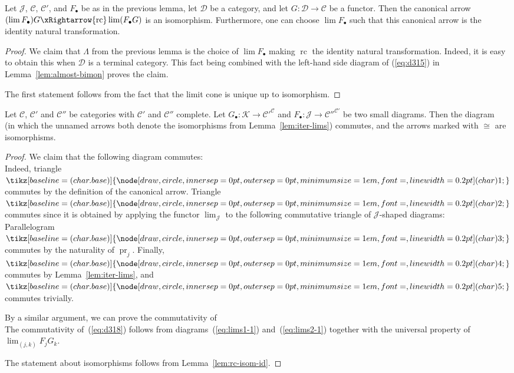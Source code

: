 \documentclass[10pt]{simplearticle}
\newcommand{\tikzinput}[1]{}
\newcommand{\tcbase}[1]{%
  \mathord{%
    \tikz[baseline=(char.base)]{
      \node[draw,circle,inner sep=0pt,outer sep=0pt,minimum size=1em,font=\small,line width=0.2pt] (char) {#1};
    }%
  }%
}
\newcommand{\pr}{\operatorname{pr}}
\newcommand{\tc}[1]{\tcbase{#1}}
\newcommand{\rc}{\operatorname{rc}}
\begin{document}
\begin{lem}\label{lem:rc-isom-id}
Let
$\mathcal{J}$, $\mathcal{C}$,
$\mathcal{C}'$, and $F_{\bullet}$ be as in the previous lemma, let
$\mathcal{D}$ be a category, and let $G\colon\mathcal{D}\to\mathcal{C}$
be a functor. Then the canonical arrow $(\lim F_{\bullet})G\xRightarrow{\rc}\lim(F_{\bullet}G)$
is an isomorphism. Furthermore, one can choose $\lim F_{\bullet}$
such that this canonical arrow is the identity natural transformation.
\end{lem}

\begin{proof}
We claim that $\Lambda$ from the previous lemma is the choice of
$\lim F_{\bullet}$ making $\rc$ the identity natural transformation.
Indeed, it is easy to obtain this when $\mathcal{D}$ is a terminal
category. This fact being combined with the left-hand side diagram
of (\ref{eq:d315}) in Lemma~\ref{lem:almost-bimon} proves the claim.

The first statement follows from the fact that the limit cone is unique
up to isomorphism.
\end{proof}

\begin{lem}\label{lem:lim-prod}
Let $\mathcal{C}$, $\mathcal{C}'$ and $\mathcal{C}''$
be categories with $\mathcal{C}'$ and $\mathcal{C}''$ complete.
Let $G_{\bullet}\colon\mathcal{K}\to\mathcal{C}'^{\mathcal{C}}$ and
$F_{\bullet}\colon\mathcal{J}\to\mathcal{C}''^{\mathcal{C}'}$ be
two small diagrams. Then the diagram
\begin{equation}
\tikzinput{d318}\label{eq:d318}
\end{equation}
(in which the unnamed arrows both denote the isomorphisms from Lemma~\ref{lem:iter-lims})
commutes, and the arrows marked with $\cong$ are isomorphisms.
\end{lem}

\begin{proof}
We claim that the following diagram commutes:
\begin{equation}
\tikzinput{d488}\label{eq:lims1-1}
\end{equation}
Indeed, triangle~$\tc 1$ commutes by the definition of the canonical
arrow. Triangle~$\tc 2$ commutes since it is obtained by applying
the functor
$\lim_{\mathcal{J}}$ to the following
commutative triangle of $\mathcal{J}$-shaped diagrams:
\begin{equation}
\tikzinput{d340}\label{eq:nat-canonar-1}
\end{equation}
Parallelogram~$\tc 3$ commutes by the naturality of $\pr_{j}$.
 Finally,~$\tc 4$ commutes by Lemma~\ref{lem:iter-lims}, and~$\tc 5$
commutes trivially.

By a similar argument, we can prove the commutativity of
\begin{equation}
\tikzinput{d267}\label{eq:lims2-1}
\end{equation}
The commutativity of~(\ref{eq:d318}) follows from diagrams~(\ref{eq:lims1-1})
and~(\ref{eq:lims2-1}) together with the universal property of $\lim_{(j,k)}F_{j}G_{k}$.

The statement about isomorphisms follows from Lemma~\ref{lem:rc-isom-id}.
\end{proof}
\end{document}
